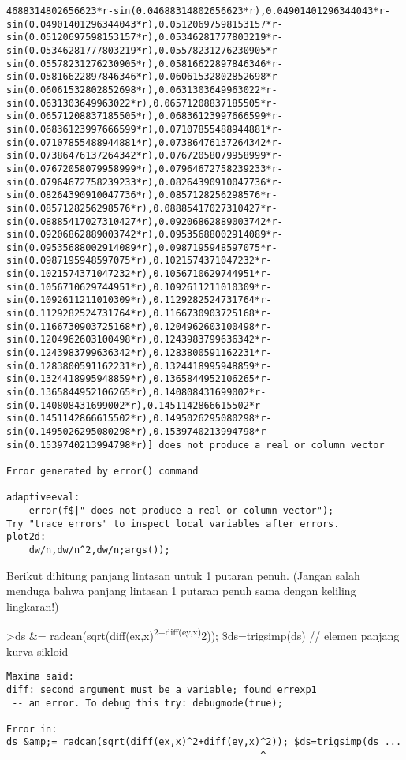 \documentclass[
]{book}
\begin{document}
\begin{verbatim}
4688314802656623*r-sin(0.04688314802656623*r),0.04901401296344043*r-sin(0.04901401296344043*r),0.05120697598153157*r-sin(0.05120697598153157*r),0.05346281777803219*r-sin(0.05346281777803219*r),0.05578231276230905*r-sin(0.05578231276230905*r),0.05816622897846346*r-sin(0.05816622897846346*r),0.06061532802852698*r-sin(0.06061532802852698*r),0.0631303649963022*r-sin(0.0631303649963022*r),0.06571208837185505*r-sin(0.06571208837185505*r),0.06836123997666599*r-sin(0.06836123997666599*r),0.07107855488944881*r-sin(0.07107855488944881*r),0.07386476137264342*r-sin(0.07386476137264342*r),0.07672058079958999*r-sin(0.07672058079958999*r),0.07964672758239233*r-sin(0.07964672758239233*r),0.08264390910047736*r-sin(0.08264390910047736*r),0.0857128256298576*r-sin(0.0857128256298576*r),0.08885417027310427*r-sin(0.08885417027310427*r),0.09206862889003742*r-sin(0.09206862889003742*r),0.09535688002914089*r-sin(0.09535688002914089*r),0.0987195948597075*r-sin(0.0987195948597075*r),0.1021574371047232*r-sin(0.1021574371047232*r),0.1056710629744951*r-sin(0.1056710629744951*r),0.1092611211010309*r-sin(0.1092611211010309*r),0.1129282524731764*r-sin(0.1129282524731764*r),0.1166730903725168*r-sin(0.1166730903725168*r),0.1204962603100498*r-sin(0.1204962603100498*r),0.1243983799636342*r-sin(0.1243983799636342*r),0.1283800591162231*r-sin(0.1283800591162231*r),0.1324418995948859*r-sin(0.1324418995948859*r),0.1365844952106265*r-sin(0.1365844952106265*r),0.140808431699002*r-sin(0.140808431699002*r),0.1451142866615502*r-sin(0.1451142866615502*r),0.1495026295080298*r-sin(0.1495026295080298*r),0.1539740213994798*r-sin(0.1539740213994798*r)] does not produce a real or column vector

Error generated by error() command

adaptiveeval:
    error(f$|" does not produce a real or column vector"); 
Try "trace errors" to inspect local variables after errors.
plot2d:
    dw/n,dw/n^2,dw/n;args());
\end{verbatim}

Berikut dihitung panjang lintasan untuk 1 putaran penuh. (Jangan salah menduga bahwa panjang lintasan 1 putaran penuh sama dengan keliling lingkaran!)

\textgreater ds \&= radcan(sqrt(diff(ex,x)\textsuperscript{2+diff(ey,x)}2)); \$ds=trigsimp(ds) // elemen panjang kurva sikloid

\begin{verbatim}
Maxima said:
diff: second argument must be a variable; found errexp1
 -- an error. To debug this try: debugmode(true);

Error in:
ds &amp;= radcan(sqrt(diff(ex,x)^2+diff(ey,x)^2)); $ds=trigsimp(ds ...
                                             ^
\end{verbatim}
\end{document}
